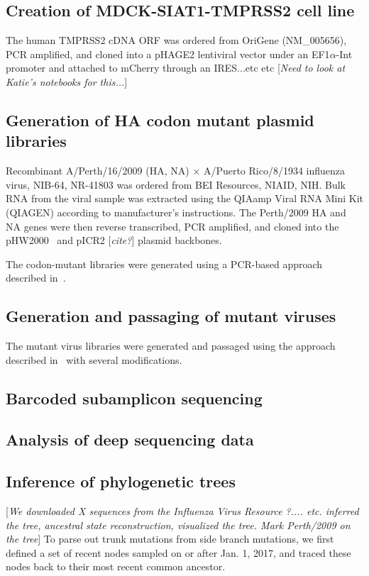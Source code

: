 \documentclass[11pt]{article}
\newcommand{\comment}[1]{{\color{red}[\textsl{#1}]}}
\begin{document}
\subsection*{Creation of MDCK-SIAT1-TMPRSS2 cell line}
The human TMPRSS2 cDNA ORF was ordered from OriGene (NM\_005656), PCR amplified, and cloned into a pHAGE2 lentiviral vector under an EF1$\alpha$-Int promoter and attached to mCherry through an IRES...etc etc
\comment{Need to look at Katie's notebooks for this...}

\subsection*{Generation of HA codon mutant plasmid libraries}
Recombinant A/Perth/16/2009 (HA, NA) $\times$ A/Puerto Rico/8/1934 influenza virus, NIB-64, NR-41803 was ordered from BEI Resources, NIAID, NIH. 
Bulk RNA from the viral sample was extracted using the QIAamp Viral RNA Mini Kit (QIAGEN) according to manufacturer's instructions.
The Perth/2009 HA and NA genes were then reverse transcribed, PCR amplified, and cloned into the pHW2000~\citep{hoffmann2000dna} and pICR2 \comment{cite?} plasmid backbones.

The codon-mutant libraries were generated using a PCR-based approach described in~\cite{dingens2017comprehensive}.

\subsection*{Generation and passaging of mutant viruses}
The mutant virus libraries were generated and passaged using the approach described in~\cite{doud2016accurate} with several modifications.

\subsection*{Barcoded subamplicon sequencing}


\subsection*{Analysis of deep sequencing data}

\subsection*{Inference of phylogenetic trees}
\comment{We downloaded X sequences from the Influenza Virus Resource ?.... etc. inferred the tree, ancestral state reconstruction, visualized the tree. Mark Perth/2009 on the tree}
To parse out trunk mutations from side branch mutations, we first defined a set of recent nodes sampled on or after Jan. 1, 2017, and traced these nodes back to their most recent common ancestor. 
\end{document}
